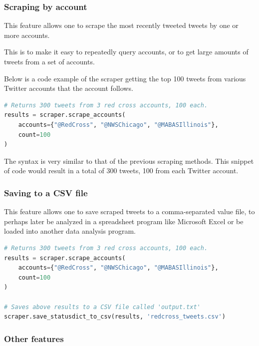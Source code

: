 \documentclass[titlepage, 12pt]{article}
\begin{document}
\subsubsection{Scraping by account}

\hspace{0.5 cm}This feature allows one to scrape the most recently tweeted tweets by one or more accounts.

This is to make it easy to repeatedly query accounts, or to get large amounts of tweets from a set of accounts.

Below is a code example of the scraper getting the top 100 tweets from various Twitter accounts that the  \@RedCross account follows.

\begin{lstlisting}[language=Python,caption=Scraping by account]
# Returns 300 tweets from 3 red cross accounts, 100 each.
results = scraper.scrape_accounts(
    accounts={"@RedCross", "@NWSChicago", "@MABASIllinois"},
    count=100
)
\end{lstlisting}

The syntax is very similar to that of the previous scraping methods. This snippet of code would result in a total of 300 tweets, 100 from each Twitter account.

\newpage

\subsubsection{Saving to a CSV file}

\hspace{0.5 cm}This feature allows one to save scraped tweets to a comma-separated value file, to perhaps later be analyzed in a spreadsheet program like Microsoft Excel or be loaded into another data analysis program.

\begin{lstlisting}[language=Python,caption=Saving to CSV]
# Returns 300 tweets from 3 red cross accounts, 100 each.
results = scraper.scrape_accounts(
    accounts={"@RedCross", "@NWSChicago", "@MABASIllinois"},
    count=100
)

# Saves above results to a CSV file called 'output.txt'
scraper.save_statusdict_to_csv(results, 'redcross_tweets.csv')
\end{lstlisting}

\subsubsection{Other features}
\end{document}

